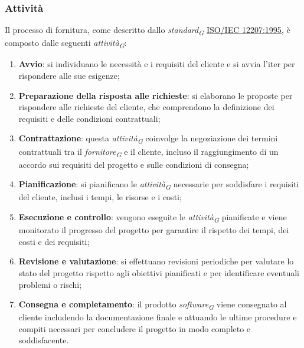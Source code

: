 \subsubsection{Attività}
Il processo di fornitura, come descritto dallo \textit{standard}\textsubscript{\textit{G}} \href{https://www.math.unipd.it/~tullio/IS-1/2009/Approfondimenti/ISO_12207-1995.pdf}{ISO/IEC 12207:1995}, è composto dalle seguenti \textit{attività}\textsubscript{\textit{G}}:
\begin{enumerate}
    \item \textbf{Avvio}: si individuano le necessità e i requisiti del cliente e si avvia l'iter per rispondere alle sue esigenze;
    \item \textbf{Preparazione della risposta alle richieste}: si elaborano le proposte per rispondere alle richieste del cliente, che comprendono la definizione dei requisiti e delle condizioni contrattuali;
    \item \textbf{Contrattazione}: questa \textit{attività}\textsubscript{\textit{G}} coinvolge la negoziazione dei termini contrattuali tra il \textit{fornitore}\textsubscript{\textit{G}} e il cliente, incluso il raggiungimento di un accordo sui requisiti del progetto e sulle condizioni di consegna;
    \item \textbf{Pianificazione}: si pianificano le \textit{attività}\textsubscript{\textit{G}} necessarie per soddisfare i requisiti del cliente, inclusi i tempi, le risorse e i costi;
    \item \textbf{Esecuzione e controllo}: vengono eseguite le \textit{attività}\textsubscript{\textit{G}} pianificate e viene monitorato il progresso del progetto per garantire il rispetto dei tempi, dei costi e dei requisiti;
    \item \textbf{Revisione e valutazione}:  si effettuano revisioni periodiche per valutare lo stato del progetto rispetto agli obiettivi pianificati e per identificare eventuali problemi o rischi;
    \item \textbf{Consegna e completamento}: il prodotto \textit{software}\textsubscript{\textit{G}} viene consegnato al cliente includendo la documentazione finale e attuando le ultime procedure e compiti necessari per concludere il progetto in modo completo e soddisfacente.
\end{enumerate}

